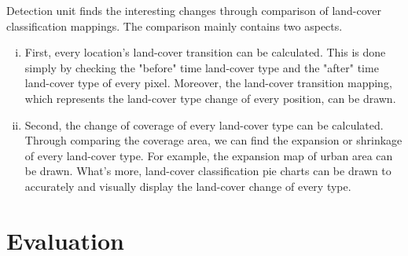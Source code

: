\documentclass{elsart}
\begin{document}
Detection unit finds the interesting changes through comparison of land-cover classification mappings.
The comparison mainly contains two aspects.
\begin{enumerate}[(i)]
\item First, every location's land-cover transition can be calculated.
This is done simply by checking the "before" time land-cover type and the "after" time land-cover type of every pixel.
Moreover, the land-cover transition mapping, which represents the land-cover type change of every position, can be drawn.
\item Second, the change of coverage of every land-cover type can be calculated.
Through comparing the coverage area, we can find the expansion or shrinkage of every land-cover type.
For example, the expansion map of urban area can be drawn.
What's more, land-cover classification pie charts can be drawn to accurately and visually display the land-cover change of every type.
\end{enumerate}
\par


\section{Evaluation}\label{benchmarkexperiment}
\end{document}
